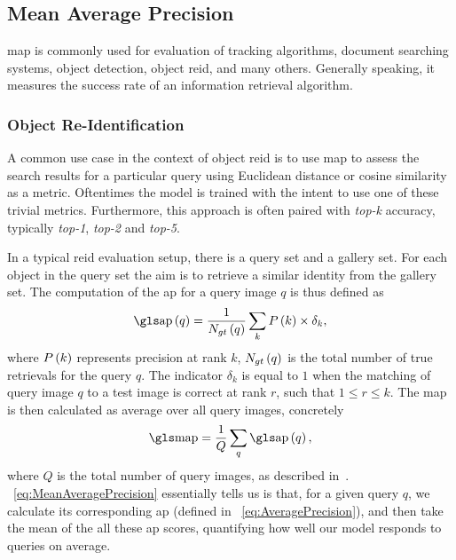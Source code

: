 \subsection{Mean Average Precision}
\label{ssec:MeanAveragePrecision}


\Gls{map} is commonly used for evaluation of tracking algorithms, document searching systems, object detection, object \gls{reid}, and many others. Generally speaking, it measures the success rate of an information retrieval algorithm.

\subsubsection{Object Re-Identification}
\label{sssec:ObjectReIdentification}

A common use case in the context of object \gls{reid} is to use \gls{map} to assess the search results for a particular query using Euclidean distance or cosine similarity as a metric. Oftentimes the model is trained with the intent to use one of these trivial metrics. Furthermore, this approach is often paired with \emph{top-k} accuracy, typically \emph{top-1}, \emph{top-2} and \emph{top-5}.

In a typical \gls{reid} evaluation setup, there is a query set and a gallery set. For each object in the query set the aim is to retrieve a similar identity from the gallery set. The computation of the \gls{ap} for a query image $q$ is thus defined as
\begin{equation}
    \label{eq:AveragePrecision}
    \func{\AP}{q} = \frac{1}{\func{N_{gt}}{q}} \sum_{k} \func{P}{k} \times {\delta}_k,
\end{equation}
where ${P} \left( k \right)$ represents precision at rank $k$, ${N_{gt}} \left( q \right)$ is the total number of true retrievals for the query $q$. The indicator ${\delta}_k$ is equal to $1$ when the matching of query image $q$ to a test image is correct at rank $r$, such that $1 \leq r \leq k$. The \gls{map} is then calculated as average over all query images, concretely
\begin{equation}
    \label{eq:MeanAveragePrecision}
    \MAP = \frac{1}{Q} \sum_q \func{\AP}{q},
\end{equation}
where $Q$ is the total number of query images, as described in~\cite{kuma2019vehiclereid}. \eqtext{}~\ref{eq:MeanAveragePrecision} essentially tells us is that, for a given query $q$, we calculate its corresponding \gls{ap} (defined in \eqtext{}~\ref{eq:AveragePrecision}), and then take the mean of the all these \gls{ap} scores, quantifying how well our model responds to queries on average.

